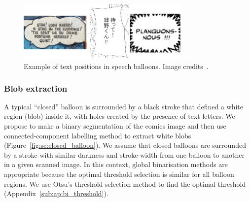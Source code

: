 	\begin{figure}[h!]	%
	  \centering
		\includegraphics[trim= 0px 0px 0px 0px, clip, width=0.75\textwidth]{text_in_balloon.png}
		\caption[Text positions in speech balloons]{Example of text positions in speech balloons. Image credits~\cite{McCall46,Inoue08,Bubble09}.}
		\label{fig:se:text_in_balloon}
	\end{figure}

\subsubsection{Blob extraction} %
\label{par:blob_extraction}

A typical ``closed'' balloon is surrounded by a black stroke that defined a white region (blob) inside it, with holes created by the presence of text letters.
We propose to make a binary segmentation of the comics image and then use connected-component labelling method to extract white blobs (Figure~\ref{fig:se:closed_balloon}).
We assume that closed balloons are surrounded by a stroke with similar darkness and stroke-width from one balloon to another in a given scanned image.
In this context, global binarisation methods are appropriate because the optimal threshold selection is similar for all balloon regions.
We use Otsu's threshold selection method to find the optimal threshold (Appendix~\ref{sub:ap:bi_threshold}).


